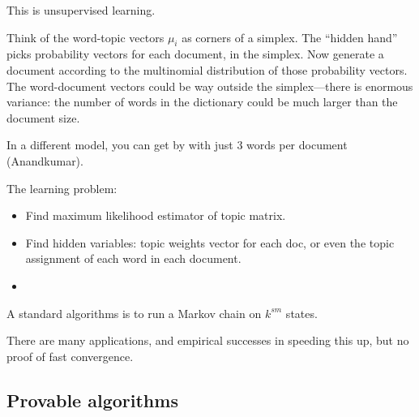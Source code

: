 This is unsupervised learning.

Think of the word-topic vectors $\mu_i$ as corners of a simplex. The ``hidden hand'' picks probability vectors for each document, in the simplex. Now generate a document according to the multinomial distribution of those probability vectors. The word-document vectors could be way outside the simplex---there is enormous variance: the number of words in the dictionary could be much larger than the document size.


In a different model, you can get by with just 3 words per document (Anandkumar).


The learning problem:
\begin{itemize}
\item
Find maximum likelihood estimator of topic matrix.
\item
Find hidden variables: topic weights vector for each doc, or even the topic assignment of each word in each document.
\item
\end{itemize}
A standard algorithms is to  run a Markov chain on $k^{sm}$ states. 

There are many applications, and empirical successes in speeding this up, but no proof of fast convergence.


\subsection{Provable algorithms}

